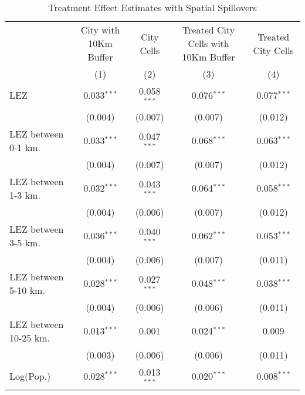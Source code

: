 
\begin{table}[htbp]
   \caption{\label{tab:te_spillovers_conley} Treatment Effect Estimates with Spatial Spillovers}
   \centering
   \small
   \begin{tabular}{lcccc}
      \tabularnewline \midrule \midrule
                            & City with 10Km Buffer & City Cells    & Treated City Cells with 10Km Buffer & Treated City Cells \\   
                            & (1)                   & (2)           & (3)                                 & (4)\\  
      LEZ                   & 0.033$^{***}$         & 0.058$^{***}$ & 0.076$^{***}$                       & 0.077$^{***}$\\   
                            & (0.004)               & (0.007)       & (0.007)                             & (0.012)\\   
      LEZ between 0-1 km.   & 0.033$^{***}$         & 0.047$^{***}$ & 0.068$^{***}$                       & 0.063$^{***}$\\   
                            & (0.004)               & (0.007)       & (0.007)                             & (0.012)\\   
      LEZ between 1-3 km.   & 0.032$^{***}$         & 0.043$^{***}$ & 0.064$^{***}$                       & 0.058$^{***}$\\   
                            & (0.004)               & (0.006)       & (0.007)                             & (0.012)\\   
      LEZ between 3-5 km.   & 0.036$^{***}$         & 0.040$^{***}$ & 0.062$^{***}$                       & 0.053$^{***}$\\   
                            & (0.004)               & (0.006)       & (0.007)                             & (0.011)\\   
      LEZ between 5-10 km.  & 0.028$^{***}$         & 0.027$^{***}$ & 0.048$^{***}$                       & 0.038$^{***}$\\   
                            & (0.004)               & (0.006)       & (0.006)                             & (0.011)\\   
      LEZ between 10-25 km. & 0.013$^{***}$         & 0.001         & 0.024$^{***}$                       & 0.009\\   
                            & (0.003)               & (0.006)       & (0.006)                             & (0.011)\\   
      Log(Pop.)             & 0.028$^{***}$         & 0.013$^{***}$ & 0.020$^{***}$                       & 0.008$^{***}$\\   

\end{tabular}
\end{table}
